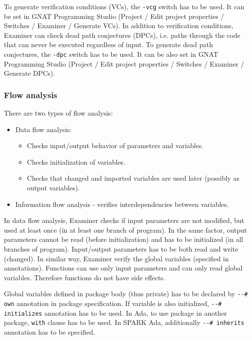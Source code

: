 To generate verification conditions (VCs), the \lstinline{-vcg} switch has to be used. It can be set in GNAT Programming Studio (Project / Edit project properties / Switches / Examiner / Generate VCs).
In addition to verification conditions, Examiner can check dead path conjectures (DPCs), i.e. paths through the code that can never be executed regardless of input. To generate dead path conjectures, the \lstinline{-dpc} switch has to be used. It can be also set in GNAT Programming Studio (Project / Edit project properties / Switches / Examiner / Generate DPCs).


\subsubsection{Flow analysis}
\label{background:sparkverification:examiner:flowanalysis}
There are two types of flow analysis:
\begin{itemize}
	\item Data flow analysis:
	\begin{itemize}
		\item Checks input/output behavior of parameters and variables.
		\item Checks initialization of variables.
		\item Checks that changed and imported variables are used later (possibly as output variables).
	\end{itemize}
	\item Information flow analysis - verifies interdependencies between variables.
\end{itemize}

In data flow analysis, Examiner checks if input parameters are not modified, but used at least once (in at least one branch of program). In the same factor, output parameters cannot be read (before initialization) and has to be initialized (in all branches of program). Input/output parameters has to be both read and write (changed). In similar way, Examiner verify the global variables (specified in annotations). Functions can use only input parameters and can only read global variables. Therefore functions do not have side effects. 

Global variables defined in package body (thus private) has to be declared by \lstinline{--# own} annotation in package specification. If variable is also initialized, \lstinline{--# initializes} annotation has to be used. In Ada, to use package in another package, \lstinline{with} clause has to be used. In SPARK Ada, additionally \lstinline{--# inherits} annotation has to be specified.

